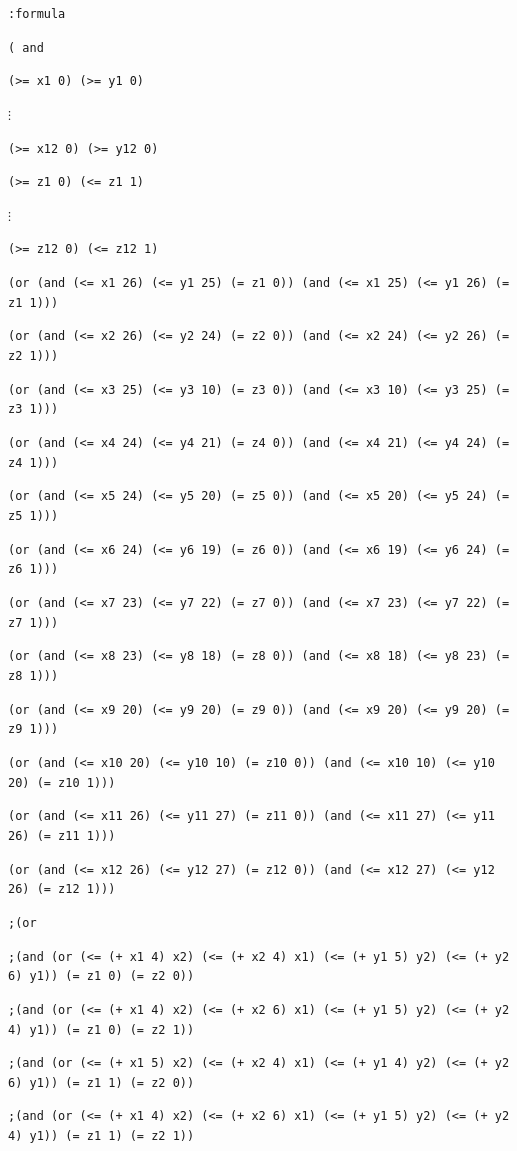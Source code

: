 \documentclass[12pt]{article}
\begin{document}
{{\tt :formula }

{\tt ( and  }

{\tt (>= x1 0) (>= y1 0)  }

$\vdots$

{\tt (>= x12 0) (>= y12 0) }

{\tt (>= z1 0) (<= z1 1) } 

$\vdots$

{\tt (>= z12 0) (<= z12 1) }

{\tt (or (and (<= x1 26) (<= y1 25) (= z1 0)) (and (<= x1 25) (<= y1 26) (= z1 1))) }

{\tt (or (and (<= x2 26) (<= y2 24) (= z2 0)) (and (<= x2 24) (<= y2 26) (= z2 1))) }

{\tt (or (and (<= x3 25) (<= y3 10) (= z3 0)) (and (<= x3 10) (<= y3 25) (= z3 1))) }

{\tt (or (and (<= x4 24) (<= y4 21) (= z4 0)) (and (<= x4 21) (<= y4 24) (= z4 1))) }

{\tt (or (and (<= x5 24) (<= y5 20) (= z5 0)) (and (<= x5 20) (<= y5 24) (= z5 1))) }

{\tt (or (and (<= x6 24) (<= y6 19) (= z6 0)) (and (<= x6 19) (<= y6 24) (= z6 1))) }

{\tt (or (and (<= x7 23) (<= y7 22) (= z7 0)) (and (<= x7 23) (<= y7 22) (= z7 1))) }

{\tt (or (and (<= x8 23) (<= y8 18) (= z8 0)) (and (<= x8 18) (<= y8 23) (= z8 1))) }

{\tt (or (and (<= x9 20) (<= y9 20) (= z9 0)) (and (<= x9 20) (<= y9 20) (= z9 1))) }

{\tt (or (and (<= x10 20) (<= y10 10) (= z10 0)) (and (<= x10 10) (<= y10 20) (= z10 1))) }

{\tt (or (and (<= x11 26) (<= y11 27) (= z11 0)) (and (<= x11 27) (<= y11 26) (= z11 1))) }

{\tt (or (and (<= x12 26) (<= y12 27) (= z12 0)) (and (<= x12 27) (<= y12 26) (= z12 1))) }

{\tt ;(or }

{\tt ;(and (or (<= (+ x1 4) x2) (<= (+ x2 4) x1) (<= (+ y1 5) y2) (<= (+ y2 6) y1)) (= z1 0) (= z2 0)) }

{\tt ;(and (or (<= (+ x1 4) x2) (<= (+ x2 6) x1) (<= (+ y1 5) y2) (<= (+ y2 4) y1)) (= z1 0) (= z2 1)) }

{\tt ;(and (or (<= (+ x1 5) x2) (<= (+ x2 4) x1) (<= (+ y1 4) y2) (<= (+ y2 6) y1)) (= z1 1) (= z2 0)) }

{\tt ;(and (or (<= (+ x1 4) x2) (<= (+ x2 6) x1) (<= (+ y1 5) y2) (<= (+ y2 4) y1)) (= z1 1) (= z2 1)) }

}
\end{document}
